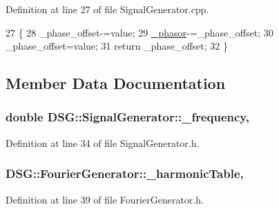 Definition at line 27 of file Signal\+Generator.\+cpp.


\begin{DoxyCode}
27                                                                 \{
28     \_phase\_offset-=value;
29     \hyperlink{classDSG_1_1SignalGenerator_ac2271b582bf699275f077ecb642a8cd9}{\_phasor}-=\_phase\_offset;
30     \_phase\_offset=value;
31     \textcolor{keywordflow}{return} \_phase\_offset;
32 \}
\end{DoxyCode}


\subsection{Member Data Documentation}
\hypertarget{classDSG_1_1SignalGenerator_a67e296e3506dcdf09402c667cddff9ac}{
\subsubsection[{\+\_\+frequency}]{\setlength{\rightskip}{0pt plus 5cm}double D\+S\+G\+::\+Signal\+Generator\+::\+\_\+frequency\hspace{0.3cm}{\ttfamily [protected]}, {\ttfamily [inherited]}}}\label{classDSG_1_1SignalGenerator_a67e296e3506dcdf09402c667cddff9ac}


Definition at line 34 of file Signal\+Generator.\+h.

\hypertarget{classDSG_1_1FourierGenerator_aedac2cf90997418836d064c90540249d}{
\subsubsection[{\+\_\+harmonic\+Table}]{ D\+S\+G\+::\+Fourier\+Generator\+::\+\_\+harmonic\+Table\hspace{0.3cm}{\ttfamily [static]}, {\ttfamily [protected]}}}\label{classDSG_1_1FourierGenerator_aedac2cf90997418836d064c90540249d}


Definition at line 39 of file Fourier\+Generator.\+h.

